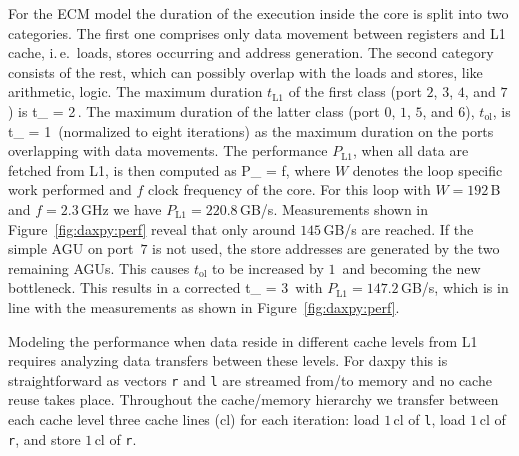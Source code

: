 For the ECM model the duration of the execution inside the core is split into
two categories.
The first one comprises only data movement between registers and L1 cache,
i.\,e.\ loads, stores occurring and address generation.
The second category consists of the rest, which can possibly overlap with the
loads and stores, like arithmetic, logic.
The maximum duration $t_\text{L1}$ of the first class (port $2$, $3$, $4$, and $7$) is
\be
  t_ = 2\,\cyw.
\ee
The maximum duration of the latter class (port $0$, $1$, $5$, and $6$), $t_\text{ol}$, is
\be
  t_ = 1\,\cyw
\ee
%
(normalized to eight iterations) as the maximum duration on the ports overlapping with data
movements.
%
%
%
The performance $P_\text{L1}$, when all data are fetched from L1, is then
computed as 
%
\be
  P_ =  f,
\ee
%
where $W$ denotes the loop specific work performed and $f$ clock
frequency of the core.
For this loop with $W=192$\,B and $f=2.3$\,GHz we have $P_\text{L1} =
220.8$\,GB/s. 
Measurements shown in Figure~\ref{fig:daxpy:perf} reveal that only around
$145$\,GB/s are reached.
If the simple AGU on port~$7$ is not used, the store addresses are
generated by the two remaining AGUs.
This causes $t_\text{ol}$ to be increased by $1$\,\cyw{} and becoming the new
bottleneck.
This results in a corrected
%
\be
   t_ = 3\,\cyw
\ee
%
with $P_\text{L1} = 147.2$\,GB/s, which is in line with the measurements as shown in Figure~\ref{fig:daxpy:perf}.


Modeling the performance when data reside in different cache levels from L1
requires analyzing data transfers between these levels.
For daxpy this is straightforward as vectors \verb'r' and \verb'l' are
streamed from/to memory and no cache reuse takes place.
Throughout the cache/memory hierarchy we transfer between each cache level three 
cache lines (cl) for each iteration: load $1$\,cl of \verb'l', load $1$\,cl of
\verb'r', and store $1$\,cl of \verb'r'.

